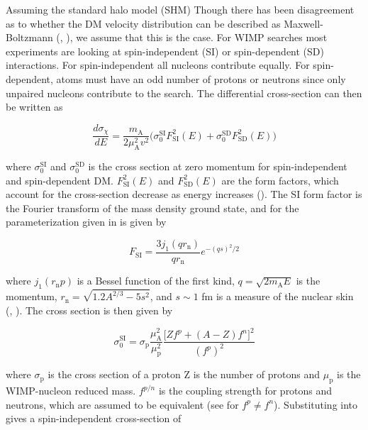 Assuming the standard halo model (SHM)
Though there has been disagreement as to whether the DM velocity distribution can be described as Maxwell-Boltzmann
(, ), we assume that this is the case.  For WIMP searches most experiments
are looking at spin-independent (SI) or spin-dependent (SD) interactions.  For spin-independent all nucleons
contribute equally.  For spin-dependent, atoms must have an odd number
of protons or neutrons since only unpaired nucleons contribute to the search.  The differential cross-section can then be written as

\begin{equation} \label{eq:diff_sigma_si}
\frac{d \sigma_{\chi}}{dE} = \frac{m_{\mathrm{A}}}{2 \mu_{\mathrm{A}}^{2} v^{2}} \big( \sigma_{0}^{\mathrm{SI}} F_{\mathrm{SI}}^{2}(E) +
\sigma_{0}^{\mathrm{SD}} F_{\mathrm{SD}}^{2}(E) \big)
\end{equation}

\noindent where $\sigma_{0}^{\mathrm{SI}}$ and $\sigma_{0}^{\mathrm{SD}}$ is the cross section at zero momentum for
spin-independent and spin-dependent DM.  $F_{\mathrm{SI}}^{2}(E)$ and $F_{\mathrm{SD}}^{2}(E)$ are the form factors, which
account for the cross-section decrease as energy increases ().  The SI form factor is
the Fourier transform of the mass density ground state, and for the parameterization given in  is given by

\begin{equation}
F_{\mathrm{SI}} = \frac{3 j_{1}(qr_{\mathrm{n}})}{qr_{\mathrm{n}}} e^{-(qs)^{2}/2}
\end{equation}

\noindent where $j_1(r_{\mathrm{n}}p)$ is a Bessel function of the first kind, $q = \sqrt{2m_{\mathrm{A}}E}$ is the momentum,
$r_{\mathrm{n}} = \sqrt{1.2A^{2/3} - 5s^{2}}$, and $s \sim 1$ fm is a measure of the nuclear skin (,
).  The cross section is then given by

\begin{equation} \label{eq:sigma_si}
\sigma_{0}^{\mathrm{SI}} = \sigma_{\mathrm{p}} \frac{\mu_{\mathrm{A}}^{2}}{\mu_{\mathrm{p}}^{2}} \frac{\big[ Z f^{p} +
(A - Z) f^{n} \big]^{2}}{(f^{p})^{2}}
\end{equation}

\noindent where $\sigma_{\mathrm{p}}$ is the cross section of a proton Z is the number of protons and $\mu_{\mathrm{p}}$ is
the WIMP-nucleon reduced mass. $f^{p/n}$ is the coupling strength for protons and neutrons, which are assumed to be
equivalent (see  for $f^{p} \neq f^{n}$).  Substituting  into 
gives a spin-independent cross-section of

